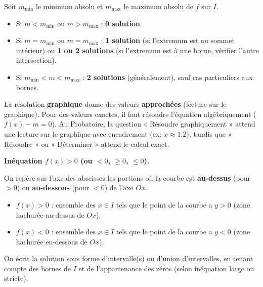 \documentclass[11pt]{article}
\begin{document}
\begin{propriete}[{Nombre de solutions de $f(x)=m$ sur $I=[m\,;\,n]$ pour $f$ polynôme degré 2}]
Soit $m_{\min}$ le minimum absolu et $m_{\max}$ le maximum absolu de $f$ sur $I$.
\begin{itemize}
    \item Si $m < m_{\min}$ ou $m > m_{\max}$ : \textbf{0 solution}.
    \item Si $m = m_{\min}$ ou $m = m_{\max}$ : \textbf{1 solution} (si l'extremum est au sommet intérieur) ou \textbf{1 ou 2 solutions} (si l'extremum est à une borne, vérifier l'autre intersection).
    \item Si $m_{\min} < m < m_{\max}$ : \textbf{2 solutions} (généralement), sauf cas particuliers aux bornes.
\end{itemize}
\end{propriete}

\begin{attention}
La résolution \textbf{graphique} donne des valeurs \textbf{approchées} (lecture sur le graphique). Pour des valeurs exactes, il faut résoudre l'équation algébriquement ($f(x)-m=0$). Au Probatoire, la question « Résoudre graphiquement » attend une lecture sur le graphique avec encadrement (ex: $x \approx \num{1,2}$), tandis que « Résoudre » ou « Déterminer » attend le calcul exact.
\end{attention}

\textbf{Inéquation $f(x) > 0$ (ou $<0$, $\ge 0$, $\le 0$).}\par
On repère sur l'axe des abscisses les portions où la courbe est \textbf{au-dessus} (pour $>0$) ou \textbf{au-dessous} (pour $<0$) de l'axe $Ox$.
\begin{itemize}
    \item $f(x) > 0$ : ensemble des $x \in I$ tels que le point de la courbe a $y>0$ (zone hachurée au-dessus de $Ox$).
    \item $f(x) < 0$ : ensemble des $x \in I$ tels que le point de la courbe a $y<0$ (zone hachurée en-dessous de $Ox$).
\end{itemize}
On écrit la solution sous forme d'intervalle(s) ou d'union d'intervalles, en tenant compte des bornes de $I$ et de l'appartenance des zéros (selon inéquation large ou stricte).
\end{document}
